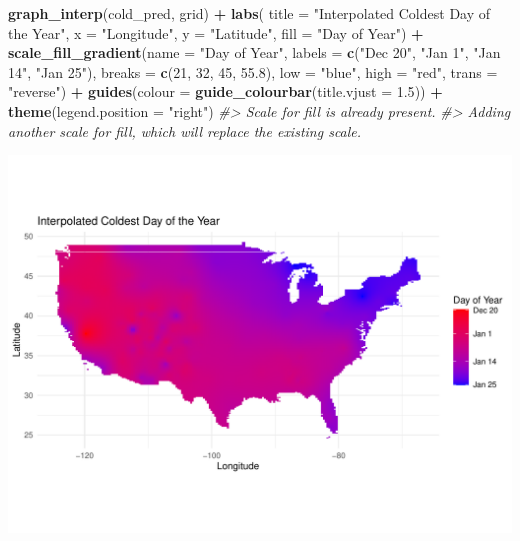 \documentclass[
]{article}
\newenvironment{Shaded}{\begin{snugshade}}{\end{snugshade}}
\newcommand{\AttributeTok}[1]{\textcolor[rgb]{0.13,0.29,0.53}{#1}}
\newcommand{\CommentTok}[1]{\textcolor[rgb]{0.56,0.35,0.01}{\textit{#1}}}
\newcommand{\DecValTok}[1]{\textcolor[rgb]{0.00,0.00,0.81}{#1}}
\newcommand{\FloatTok}[1]{\textcolor[rgb]{0.00,0.00,0.81}{#1}}
\newcommand{\FunctionTok}[1]{\textcolor[rgb]{0.13,0.29,0.53}{\textbf{#1}}}
\newcommand{\NormalTok}[1]{#1}
\newcommand{\SpecialCharTok}[1]{\textcolor[rgb]{0.81,0.36,0.00}{\textbf{#1}}}
\newcommand{\StringTok}[1]{\textcolor[rgb]{0.31,0.60,0.02}{#1}}
\begin{document}
\begin{Shaded}
\begin{Highlighting}[]

\FunctionTok{graph\_interp}\NormalTok{(cold\_pred, grid) }\SpecialCharTok{+} 
  \FunctionTok{labs}\NormalTok{( }\AttributeTok{title =} \StringTok{"Interpolated Coldest Day of the Year"}\NormalTok{,}
    \AttributeTok{x =} \StringTok{"Longitude"}\NormalTok{, }\AttributeTok{y =} \StringTok{"Latitude"}\NormalTok{, }
    \AttributeTok{fill =} \StringTok{"Day of Year"}\NormalTok{) }\SpecialCharTok{+} 
  \FunctionTok{scale\_fill\_gradient}\NormalTok{(}\AttributeTok{name =} \StringTok{"Day of Year"}\NormalTok{, }
                      \AttributeTok{labels =} \FunctionTok{c}\NormalTok{(}\StringTok{"Dec 20"}\NormalTok{, }\StringTok{"Jan 1"}\NormalTok{, }\StringTok{"Jan 14"}\NormalTok{, }\StringTok{"Jan 25"}\NormalTok{),}
                       \AttributeTok{breaks =} \FunctionTok{c}\NormalTok{(}\DecValTok{21}\NormalTok{, }\DecValTok{32}\NormalTok{, }\DecValTok{45}\NormalTok{, }\FloatTok{55.8}\NormalTok{),}
                      \AttributeTok{low =} \StringTok{"blue"}\NormalTok{, }\AttributeTok{high =} \StringTok{"red"}\NormalTok{, }\AttributeTok{trans =} \StringTok{"reverse"}\NormalTok{)  }\SpecialCharTok{+}
  \FunctionTok{guides}\NormalTok{(}\AttributeTok{colour =} \FunctionTok{guide\_colourbar}\NormalTok{(}\AttributeTok{title.vjust =} \FloatTok{1.5}\NormalTok{)) }\SpecialCharTok{+}
  \FunctionTok{theme}\NormalTok{(}\AttributeTok{legend.position =} \StringTok{"right"}\NormalTok{)}
\CommentTok{\#\textgreater{} Scale for fill is already present.}
\CommentTok{\#\textgreater{} Adding another scale for fill, which will replace the existing scale.}
\end{Highlighting}
\end{Shaded}

\includegraphics{seesaw_files/figure-latex/unnamed-chunk-8-2.pdf}
\end{document}
